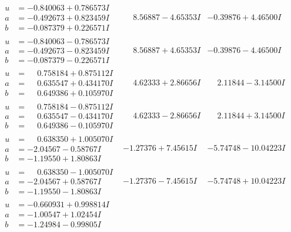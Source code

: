 \documentclass[1p]{elsarticle_modified}
\theoremstyle{definition}
\begin{document}
$$\begin{array}{c|c|c}
\begin{aligned}
u &= -0.840063 + 0.786573 I \\
a &= -0.492673 + 0.823459 I \\
b &= -0.087379 + 0.226571 I\end{aligned}
 & \phantom{-}8.56887 - 4.65353 I & -0.39876 + 4.46500 I \\ \hline\begin{aligned}
u &= -0.840063 - 0.786573 I \\
a &= -0.492673 - 0.823459 I \\
b &= -0.087379 - 0.226571 I\end{aligned}
 & \phantom{-}8.56887 + 4.65353 I & -0.39876 - 4.46500 I \\ \hline\begin{aligned}
u &= \phantom{-}0.758184 + 0.875112 I \\
a &= \phantom{-}0.635547 + 0.434170 I \\
b &= \phantom{-}0.649386 + 0.105970 I\end{aligned}
 & \phantom{-}4.62333 + 2.86656 I & \phantom{-}2.11844 - 3.14500 I \\ \hline\begin{aligned}
u &= \phantom{-}0.758184 - 0.875112 I \\
a &= \phantom{-}0.635547 - 0.434170 I \\
b &= \phantom{-}0.649386 - 0.105970 I\end{aligned}
 & \phantom{-}4.62333 - 2.86656 I & \phantom{-}2.11844 + 3.14500 I \\ \hline\begin{aligned}
u &= \phantom{-}0.638350 + 1.005070 I \\
a &= -2.04567 - 0.58767 I \\
b &= -1.19550 + 1.80863 I\end{aligned}
 & -1.27376 + 7.45615 I & -5.74748 - 10.04223 I \\ \hline\begin{aligned}
u &= \phantom{-}0.638350 - 1.005070 I \\
a &= -2.04567 + 0.58767 I \\
b &= -1.19550 - 1.80863 I\end{aligned}
 & -1.27376 - 7.45615 I & -5.74748 + 10.04223 I \\ \hline\begin{aligned}
u &= -0.660931 + 0.998814 I \\
a &= -1.00547 + 1.02454 I \\
b &= -1.24984 - 0.99805 I\end{aligned}

\end{array}$$
\end{document}
